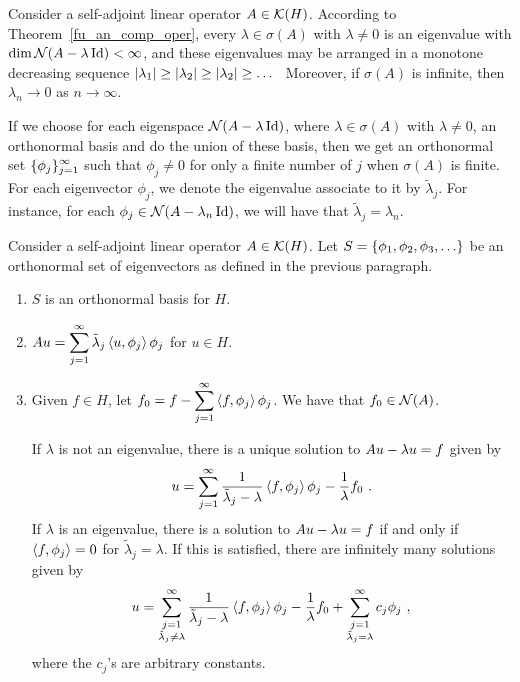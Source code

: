 Consider a self-adjoint linear operator $A \in \mathcal{K}(H)$.  According to
Theorem~\ref{fu_an_comp_oper}, every $\lambda \in \sigma(A)$ with
$\lambda \neq 0$ is an eigenvalue with
$\dim \mathcal{N}(A-\lambda\operatorname{Id}) < \infty$, and these
eigenvalues may be arranged in a monotone decreasing sequence
$\displaystyle |\lambda_1| \geq |\lambda_2| \geq |\lambda_2| \geq \ldots$
\ Moreover, if $\sigma(A)$ is infinite, then
$\lambda_n \rightarrow 0$ as $n\rightarrow \infty$.

If we choose for each eigenspace $\mathcal{N}(A-\lambda\operatorname{Id})$, where
$\lambda \in \sigma(A)$ with $\lambda \neq 0$, an orthonormal
basis and do the union of these basis, then we get an orthonormal set
$\displaystyle \{ \phi_j \}_{j=1}^\infty$ such that $\phi_j \neq 0$
for only a finite number of $j$ when $\sigma(A)$ is finite.
For each eigenvector $\phi_j$, we denote the eigenvalue associate to
it by $\tilde{\lambda}_j$.  For instance,
for each $\phi_j \in \mathcal{N}(A- \lambda_n \operatorname{Id})$, we will have that 
$\tilde{\lambda}_j = \lambda_n$.

\begin{theorem} \label{fu_an_HStheorem}
Consider a self-adjoint linear operator $A \in \mathcal{K}(H)$.
Let $\displaystyle S = \left\{ \phi_1, \phi_2, \phi_3, \ldots \right\}$ be
an orthonormal set of eigenvectors as defined in the previous
paragraph.
\begin{enumerate}
\item $S$ is an orthonormal basis for $H$.
\item $\displaystyle Au =
\sum_{j=1}^{\infty} \tilde{\lambda}_j \left\langle{u} , {\phi_j}\right\rangle\phi_j$ for $u \in H$.
\item Given $f\in H$, let
$\displaystyle f_0 = f - \sum_{j=1}^{\infty} \left\langle{f} , {\phi_j}\right\rangle\phi_j$.
We have that $f_0 \in \mathcal{N}(A)$.

If $\lambda$ is not an eigenvalue, there is a unique solution
to $\displaystyle Au - \lambda u = f$ given by
\[
u = \sum_{j=1}^{\infty} \frac{1}{\tilde{\lambda}_j-\lambda}
\left\langle{f} , {\phi_j}\right\rangle \phi_j - \frac{1}{\lambda} f_0 \ .
\]
If $\lambda$ is an eigenvalue, there is a solution to
$\displaystyle Au - \lambda u = f$ if and only if
$\displaystyle \left\langle{f} , {\phi_j}\right\rangle = 0$ for $\tilde{\lambda}_j = \lambda$.
If this is satisfied, there are infinitely many solutions given by
\[
u = \sum_{\substack{j=1\\ \tilde{\lambda}_j\neq \lambda}}^\infty
\frac{1}{\tilde{\lambda}_j-\lambda} \left\langle{f} , {\phi_j}\right\rangle \phi_j -
\frac{1}{\lambda} f_0
+ \sum_{\substack{j=1\\ \tilde{\lambda}_j  = \lambda}}^\infty c_j \phi_j \ ,
\]
where the $c_j$'s are arbitrary constants.
\end{enumerate}
\end{theorem}

